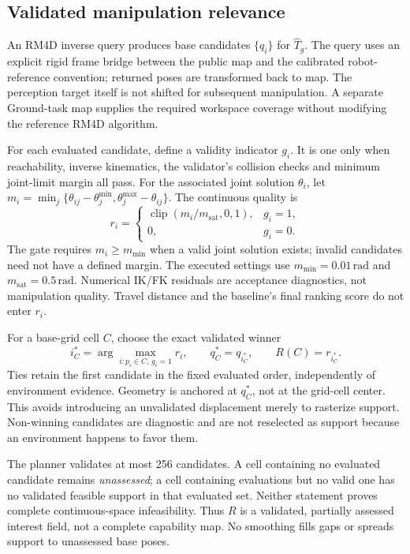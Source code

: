 \subsection{Validated manipulation relevance}
\label{sec:relevance}
An RM4D inverse query \cite{rudorfer2025rm4d} produces base candidates
$\{q_i\}$ for $\widehat{T}_g$. The query uses an explicit rigid frame bridge
between the public map and the calibrated robot-reference convention; returned
poses are transformed back to map. The perception target itself is not shifted
for subsequent manipulation. A separate Ground-task map supplies the required
workspace coverage without modifying the reference RM4D algorithm.

For each evaluated candidate, define a validity indicator $g_i$. It is one only
when reachability, inverse kinematics, the validator's collision checks and
minimum joint-limit margin all pass. For the associated joint solution $\theta_i$,
let $m_i=\min_j\{\theta_{ij}-\theta_j^{\min},\theta_j^{\max}-\theta_{ij}\}$.
The continuous quality is
\begin{equation}
 r_i=\begin{cases}
 \operatorname{clip}(m_i/m_{\mathrm{sat}},0,1),&g_i=1,\\
 0,&g_i=0.
 \end{cases}
 \label{eq:quality}
\end{equation}
The gate requires $m_i\ge m_{\min}$ when a valid joint solution exists;
invalid candidates need not have a defined margin. The executed settings use
$m_{\min}=0.01\,\mathrm{rad}$ and
$m_{\mathrm{sat}}=0.5\,\mathrm{rad}$. Numerical IK/FK residuals are acceptance
diagnostics, not manipulation quality. Travel distance and the baseline's final
ranking score do not enter $r_i$.

For a base-grid cell $C$, choose the exact validated winner
\begin{equation}
 i_C^*=\arg\max_{i:p_i\in C,\,g_i=1} r_i,\qquad
 q_C^*=q_{i_C^*},\qquad R(C)=r_{i_C^*}.
 \label{eq:winner}
\end{equation}
Ties retain the first candidate in the fixed evaluated order, independently of
environment evidence. Geometry is anchored at $q_C^*$, not at the grid-cell
center. This avoids introducing an unvalidated displacement merely to rasterize
support. Non-winning candidates are diagnostic and are not reselected as support
because an environment happens to favor them.

The planner validates at most 256 candidates. A cell containing no evaluated
candidate remains \emph{unassessed}; a cell containing evaluations but no valid
one has no validated feasible support in that evaluated set. Neither statement
proves complete continuous-space infeasibility. Thus $R$ is a validated,
partially assessed interest field, not a complete capability map. No smoothing
fills gaps or spreads support to unassessed base poses.

